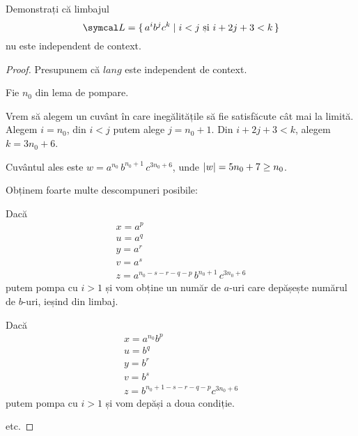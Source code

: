 \begin{exercise}
    Demonstrați că limbajul
    \[\lang = \set{ a^i b^j c^k | i < j \text{ și } i + 2j + 3 < k }\]
    nu este independent de context.
\end{exercise}
\begin{proof}
    Presupunem că \(lang\) este independent de context.

    Fie \(n_0\) din lema de pompare.

    Vrem să alegem un cuvânt în care inegălitățile să fie satisfăcute cât mai la limită.
    Alegem \(i = n_0\), din \(i < j\) putem alege \(j = n_0 + 1\).
    Din \(i + 2j + 3 < k\), alegem \(k = 3 n_0 + 6\).

    Cuvântul ales este \(w = a^{n_0} \, b^{n_0 + 1} \, c^{3 n_0 + 6}\), unde \(\left\lvert w\right\rvert = 5 n_0 + 7 \geq n_0\).

    Obținem foarte multe descompuneri posibile:

    Dacă
    \begin{gather*}
        x = a^p \\
        u = a^q \\
        y = a^r \\
        v = a^s \\
        z = a^{n_0 - s - r - q - p} \, b^{n_0 + 1} \, c^{3 n_0 + 6}
    \end{gather*}
    putem pompa cu \(i > 1\) și vom obține un număr de \(a\)-uri care depășește numărul de \(b\)-uri, ieșind din limbaj.

    Dacă
    \begin{gather*}
        x = a^{n_0} b^p \\
        u = b^q \\
        y = b^r \\
        v = b^s \\
        z = b^{n_0 + 1 - s - r - q - p} c^{3 n_0 + 6}
    \end{gather*}
    putem pompa cu \(i > 1\) și vom depăși a doua condiție.

    etc.
\end{proof}

